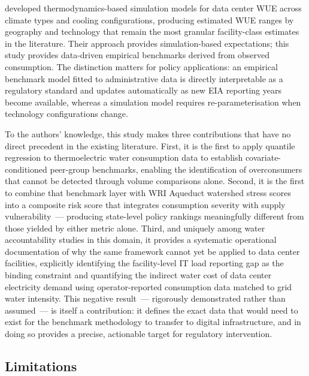 \documentclass[11pt, letterpaper]{article}
\begin{document}
\citep{lei2022} developed thermodynamics-based simulation models for data center WUE across climate types and cooling configurations, producing estimated WUE ranges by geography and technology that remain the most granular facility-class estimates in the literature. Their approach provides simulation-based expectations; this study provides data-driven empirical benchmarks derived from observed consumption. The distinction matters for policy applications: an empirical benchmark model fitted to administrative data is directly interpretable as a regulatory standard and updates automatically as new EIA reporting years become available, whereas a simulation model requires re-parameterisation when technology configurations change.

To the authors' knowledge, this study makes three contributions that have no direct precedent in the existing literature. First, it is the first to apply quantile regression to thermoelectric water consumption data to establish covariate-conditioned peer-group benchmarks, enabling the identification of overconsumers that cannot be detected through volume comparisons alone. Second, it is the first to combine that benchmark layer with WRI Aqueduct watershed stress scores into a composite risk score that integrates consumption severity with supply vulnerability~--- producing state-level policy rankings meaningfully different from those yielded by either metric alone. Third, and uniquely among water accountability studies in this domain, it provides a systematic operational documentation of why the same framework cannot yet be applied to data center facilities, explicitly identifying the facility-level IT load reporting gap as the binding constraint and quantifying the indirect water cost of data center electricity demand using operator-reported consumption data matched to grid water intensity. This negative result~--- rigorously demonstrated rather than assumed~--- is itself a contribution: it defines the exact data that would need to exist for the benchmark methodology to transfer to digital infrastructure, and in doing so provides a precise, actionable target for regulatory intervention.

\subsection{Limitations}
\end{document}
